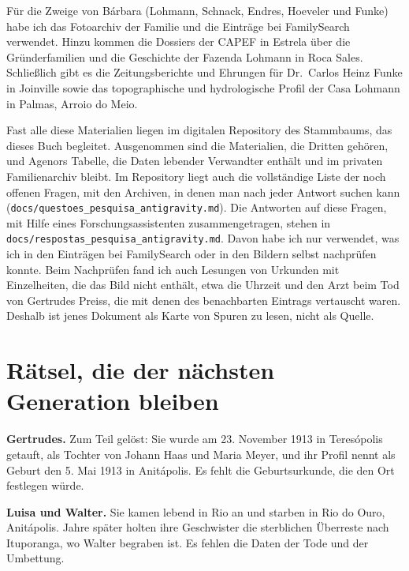 \documentclass[
  ngerman,
  11pt,
  openany]{book}
\begin{document}
Für die Zweige von Bárbara (Lohmann, Schnack, Endres, Hoeveler und
Funke) habe ich das Fotoarchiv der Familie und die Einträge bei
FamilySearch verwendet. Hinzu kommen die Dossiers der CAPEF in Estrela
über die Gründerfamilien und die Geschichte der Fazenda Lohmann in Roca
Sales. Schließlich gibt es die Zeitungsberichte und Ehrungen für
Dr.~Carlos Heinz Funke in Joinville sowie das topographische und
hydrologische Profil der Casa Lohmann in Palmas, Arroio do Meio.

Fast alle diese Materialien liegen im digitalen Repository des
Stammbaums, das dieses Buch begleitet. Ausgenommen sind die Materialien,
die Dritten gehören, und Agenors Tabelle, die Daten lebender Verwandter
enthält und im privaten Familienarchiv bleibt. Im Repository liegt auch
die vollständige Liste der noch offenen Fragen, mit den Archiven, in
denen man nach jeder Antwort suchen kann
(\texttt{docs/questoes\_pesquisa\_antigravity.md}). Die Antworten auf
diese Fragen, mit Hilfe eines Forschungsassistenten zusammengetragen,
stehen in \texttt{docs/respostas\_pesquisa\_antigravity.md}. Davon habe
ich nur verwendet, was ich in den Einträgen bei FamilySearch oder in den
Bildern selbst nachprüfen konnte. Beim Nachprüfen fand ich auch Lesungen
von Urkunden mit Einzelheiten, die das Bild nicht enthält, etwa die
Uhrzeit und den Arzt beim Tod von Gertrudes Preiss, die mit denen des
benachbarten Eintrags vertauscht waren. Deshalb ist jenes Dokument als
Karte von Spuren zu lesen, nicht als Quelle.

\section{Rätsel, die der nächsten Generation
bleiben}\label{ruxe4tsel-die-der-nuxe4chsten-generation-bleiben}

\textbf{Gertrudes.} Zum Teil gelöst: Sie wurde am 23. November 1913 in
Teresópolis getauft, als Tochter von Johann Haas und Maria Meyer, und
ihr Profil nennt als Geburt den 5. Mai 1913 in Anitápolis. Es fehlt die
Geburtsurkunde, die den Ort festlegen würde.

\textbf{Luisa und Walter.} Sie kamen lebend in Rio an und starben in Rio
do Ouro, Anitápolis. Jahre später holten ihre Geschwister die
sterblichen Überreste nach Ituporanga, wo Walter begraben ist. Es fehlen
die Daten der Tode und der Umbettung.
\end{document}
